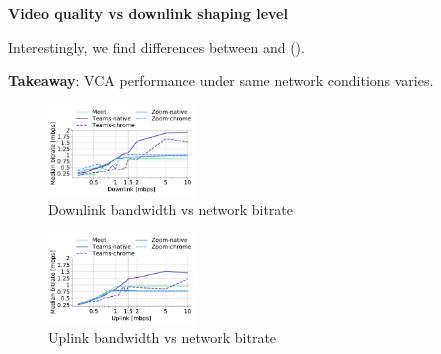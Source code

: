 \textbf{Video quality vs downlink shaping level}

\textbf{}




Interestingly, we find differences between \zoomnative and \zoombrowser ().

\textbf{Takeaway}: VCA performance under same network conditions varies.  




\begin{figure}[]
\centering
    \includegraphics[width=0.35\textwidth,keepaspectratio]{figures/static/downlink.pdf}
    \caption{Downlink bandwidth vs network bitrate}
	\label{fig:downlink_bitrate}
\end{figure}



\begin{figure}[]
\centering
    \includegraphics[width=0.35\textwidth,keepaspectratio]{figures/static/uplink.pdf}
    \caption{Uplink bandwidth vs network bitrate}
	\label{fig:uplink_bitrate}
\end{figure}




